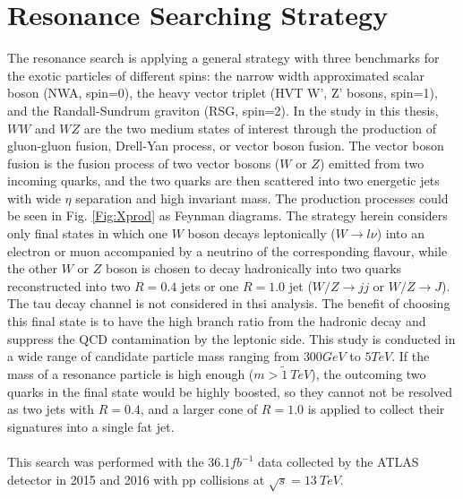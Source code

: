 \chapter{Resonance Searching Strategy}
The resonance search is applying a general strategy with three benchmarks for the exotic particles of different spins: the narrow width approximated scalar boson (NWA, spin=0), the heavy vector triplet (HVT W', Z' bosons, spin=1), and the Randall-Sundrum graviton (RSG, spin=2).
In the study in this thesis, $WW$ and $WZ$ are the two medium states of interest through the production of gluon-gluon fusion, Drell-Yan process, or vector boson fusion. The vector boson fusion is the fusion process of two vector bosons ($W$ or $Z$) emitted from two incoming quarks, and the two quarks are then scattered into two energetic jets with wide $\eta$ separation and high invariant mass. The production processes could be seen in Fig. \ref{Fig:Xprod} as Feynman diagrams. The strategy herein considers only final states in which one $W$ boson decays leptonically ($W\rightarrow l\nu$) into an electron or muon accompanied by a neutrino of the corresponding flavour, while the other $W$ or $Z$ boson is chosen to decay hadronically into two quarks reconstructed into two $R=0.4$ jets or one $R=1.0$ jet ($W/Z\rightarrow jj$ or $W/Z\rightarrow J$). The tau decay channel is not considered in thsi analysis. The benefit of choosing this final state is to have the high branch ratio from the hadronic decay and suppress the QCD contamination by the leptonic side. This study is conducted in a wide range of candidate particle mass ranging from $300GeV$ to $5TeV$. If the mass of a resonance particle is high enough ($m>\tilde1~TeV$), the outcoming two quarks in the final state would be highly boosted, so they cannot not be resolved as two jets with $R=0.4$, and a larger cone of $R=1.0$ is applied to collect their signatures into a single fat jet. 
\\
\\This search was performed with the $36.1fb^{-1}$ data collected by the ATLAS detector in 2015 and 2016 with pp collisions at $\sqrt{s}=13~TeV$. 

